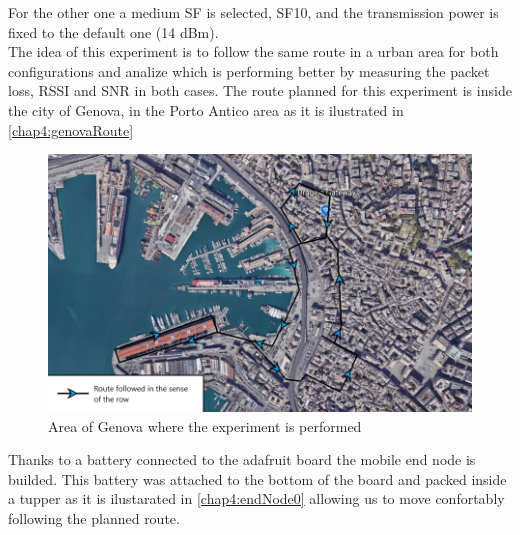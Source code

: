 For the other one a medium SF is selected, SF10, and the transmission power is fixed to the default one (14 dBm).\\
The idea of this experiment is to follow the same route in a urban area for both configurations and analize 
which is performing better by measuring the packet loss, RSSI and SNR in both cases. 
The route planned for this experiment is inside the city of Genova, in the Porto Antico area as it is 
ilustrated in \vref{chap4:genovaRoute}

\begin{figure}[htbp]
    \includegraphics[width=\linewidth]{Gnv_route.png}
    \caption{Area of Genova where the experiment is performed}
    \label{chap4:genovaRoute}
\end{figure}

Thanks to a battery connected to the adafruit board the mobile end node is builded. 
This battery was attached to the bottom of the board and packed inside a tupper as it is ilustarated 
in \ref{chap4:endNode0} allowing us to move confortably following the planned route.


